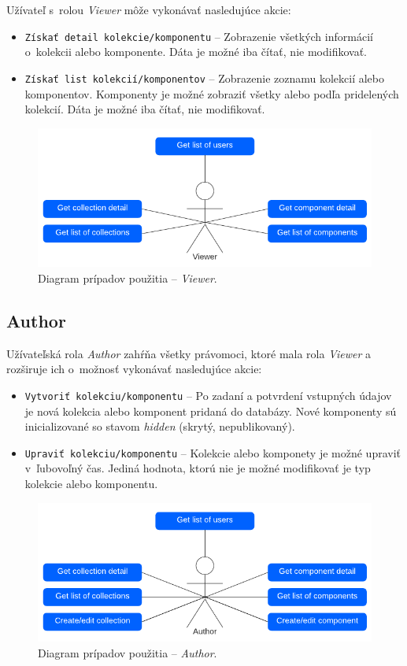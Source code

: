 \noindent Užívateľ s~rolou \emph{Viewer} môže vykonávať nasledujúce akcie:

\begin{itemize}
	\item \texttt{Získať detail kolekcie/komponentu} -- Zobrazenie všetkých informácií o~kolekcii alebo komponente. Dáta je možné iba čítať, nie modifikovať.
	\item \texttt{Získať list kolekcií/komponentov} -- Zobrazenie zoznamu kolekcií alebo komponentov. Komponenty je možné zobraziť všetky alebo podľa pridelených kolekcií. Dáta je možné iba čítať, nie modifikovať.
\end{itemize}

\begin{figure}[H]
	\centering
	\includegraphics[scale=0.9]{obrazky-figures/viewer_use_case}
	\caption{Diagram prípadov použitia -- \emph{Viewer}.}
\end{figure}

\subsection{Author}
Užívateľská rola \emph{Author} zahŕňa všetky právomoci, ktoré mala rola \emph{Viewer} a rozširuje ich o~možnosť vykonávať nasledujúce akcie:

\begin{itemize}
	\item \texttt{Vytvoriť kolekciu/komponentu} -- Po zadaní a potvrdení vstupných údajov je nová kolekcia alebo komponent pridaná do databázy. Nové komponenty sú inicializované so stavom \emph{hidden} (skrytý, nepublikovaný).
	\item \texttt{Upraviť kolekciu/komponentu} -- Kolekcie alebo komponety je možné upraviť v~ľubovoľný čas. Jediná hodnota, ktorú nie je možné modifikovať je typ kolekcie alebo komponentu.
\end{itemize}

\begin{figure}[H]
	\centering
	\includegraphics[scale=0.9]{obrazky-figures/author_use_case}
	\caption{Diagram prípadov použitia -- \emph{Author}.}
\end{figure}

